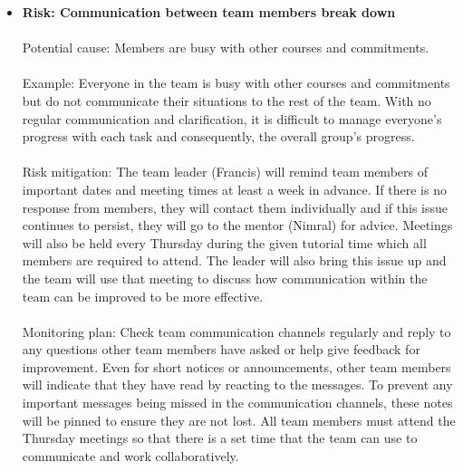 \begin{itemize}
\item\textbf{Risk: Communication between team members break down}
\\
\\ Potential cause: Members are busy with other courses and commitments.
\\
\\ Example: Everyone in the team is busy with other courses and commitments but do not communicate their situations to the rest of the team. With no regular communication and clarification, it is difficult to manage everyone’s progress with each task and consequently, the overall group’s progress.
\\
\\ Risk mitigation: The team leader (Francis) will remind team members of important dates and meeting times at least a week in advance. If there is no response from members, they will contact them individually and if this issue continues to persist, they will go to the mentor (Nimral) for advice. Meetings will also be held every Thursday during the given tutorial time which all members are required to attend. The leader will also bring this issue up and the team will use that meeting to discuss how communication within the team can be improved to be more effective.
\\
\\ Monitoring plan: Check team communication channels regularly and reply to any questions other team members have asked or help give feedback for improvement. Even for short notices or announcements, other team members will indicate that they have read by reacting to the messages. To prevent any important messages being missed in the communication channels, these notes will be pinned to ensure they are not lost. All team members must attend the Thursday meetings so that there is a set time that the team can use to communicate and work collaboratively.
\\
\\



\end{itemize}
